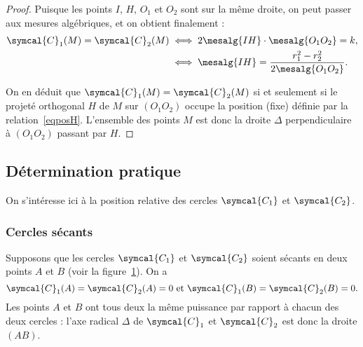 \begin{proof}
Puisque les points $I$, $H$, $O_1$ et $O_2$ sont sur la même droite, on peut  passer aux mesures algébriques, et on obtient finalement :
\begin{align}
\symcal{C}_1(M)=\symcal{C}_2(M)&\iff 2\mesalg{IH}\cdot\mesalg{O_1O_2}=k,\notag\\
&\iff\mesalg{IH}=\frac{r_1^2-r_2^2}{2\mesalg{O_1O_2}}.\label{eqposH}
\end{align}


On en déduit que $\symcal{C}_1(M)=\symcal{C}_2(M)$ si et seulement si le projeté orthogonal $H$ de $M$ sur $(O_1O_2)$ occupe la position (fixe) définie par la relation~\eqref{eqposH}. L'ensemble des points $M$ est donc la droite $\Delta$ perpendiculaire à $(O_1O_2)$ passant par $H$.
\end{proof}

\subsection{Détermination pratique}\label{subsecdetprat}
On s'intéresse ici à la position relative des cercles $\symcal{C_1}$ et $\symcal{C_2}$.
\subsubsection{Cercles sécants}
Supposons que les cercles $\symcal{C_1}$ et $\symcal{C_2}$ soient sécants en deux points $A$ et $B$ (voir la figure~\ref{figaxerad1}). On a 
\[\symcal{C}_1(A)=\symcal{C}_2(A)=0 \text{ et }\symcal{C}_1(B)=\symcal{C}_2(B)=0 .
\]
Les points $A$ et $B$ ont tous deux la même puissance par rapport à chacun des deux cercles : l'axe radical $\Delta$ de $\symcal{C}_1$ et $\symcal{C}_2$ est donc la droite $(AB)$.


\begin{figure}[ht]
\centering
{}
\figcaption{}\label{figaxerad1}
\end{figure}

